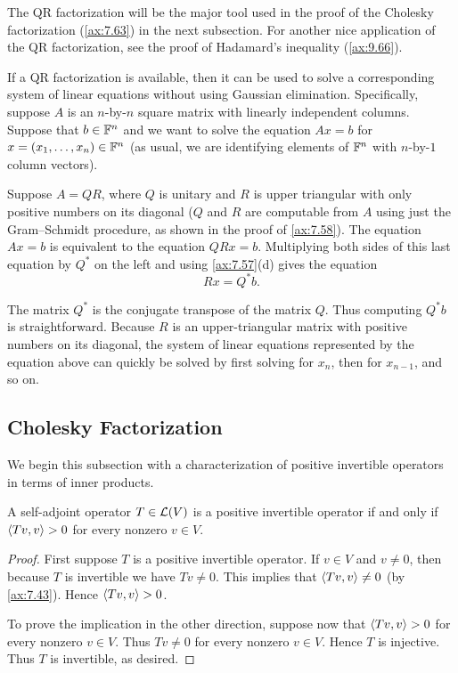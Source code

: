 The QR factorization will be the major tool used in the proof of the Cholesky
factorization (\ref{ax:7.63}) in the next subsection. For another nice
application of the QR factorization, see the proof of Hadamard's inequality
(\ref{ax:9.66}).

If a QR factorization is available, then it can be used to solve a
corresponding system of linear equations without using Gaussian elimination.
Specifically, suppose $A$ is an $n$-by-$n$ square matrix with linearly
independent columns. Suppose that $b\in\mathbb{F}^n$ and we want to solve the equation
$Ax=b$ for $x=(x_1,\dots,x_n)\in\mathbb{F}^n$ (as usual, we are identifying elements of
$\mathbb{F}^n$ with $n$-by-$1$ column vectors).

Suppose $A=QR$, where $Q$ is unitary and $R$ is upper triangular with only
positive numbers on its diagonal ($Q$ and $R$ are computable from $A$ using
just the Gram--Schmidt procedure, as shown in the proof of \ref{ax:7.58}). The
equation $Ax=b$ is equivalent to the equation $QRx=b$. Multiplying both sides of
this last equation by $Q^*$ on the left and using \ref{ax:7.57}(d) gives the
equation
\[ Rx=Q^*b. \]

The matrix $Q^*$ is the conjugate transpose of the matrix $Q$. Thus computing
$Q^*b$ is straightforward. Because $R$ is an upper-triangular matrix with
positive numbers on its diagonal, the system of linear equations represented by
the equation above can quickly be solved by first solving for $x_n$, then for
$x_{n-1}$, and so on.

\subsection{Cholesky Factorization}

We begin this subsection with a characterization of positive invertible
operators in terms of inner products.

\begin{result}\label{ax:7.61}
A self-adjoint operator $T\in\mathcal{L}(V)$ is a positive invertible operator if and
only if $\langle Tv, v \rangle>0$ for every nonzero $v\in V$.
\end{result}

\begin{proof}
First suppose $T$ is a positive invertible operator. If $v\in V$ and $v\ne0$,
then because $T$ is invertible we have $Tv\ne0$. This implies that
$\langle Tv, v \rangle\ne0$ (by \ref{ax:7.43}). Hence $\langle Tv, v \rangle>0$.

To prove the implication in the other direction, suppose now that
$\langle Tv, v \rangle>0$ for every nonzero $v\in V$. Thus $Tv\ne0$ for every nonzero
$v\in V$. Hence $T$ is injective. Thus $T$ is invertible, as desired.
\end{proof}

